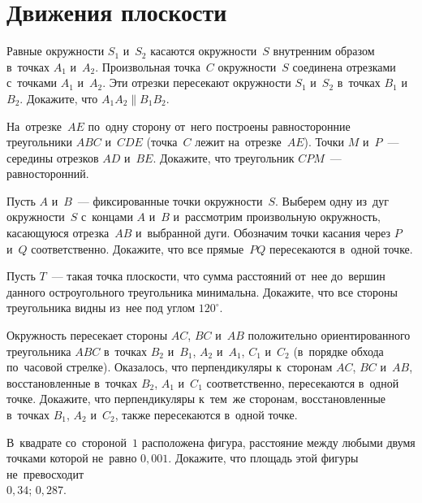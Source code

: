 
\section*{Движения плоскости}


\begin{problems}

\item
Равные окружности $S_1$ и~$S_2$ касаются окружности~$S$ внутренним образом
в~точках $A_1$ и~$A_2$.
Произвольная точка~$C$ окружности~$S$ соединена отрезками с~точками $A_1$ и~$A_2$.
Эти отрезки пересекают окружности $S_1$ и~$S_2$ в~точках $B_1$ и~$B_2$.
Докажите, что $A_1 A_2 \parallel B_1 B_2$.

\item
На~отрезке~$AE$ по~одну сторону от~него построены равносторонние треугольники
$ABC$ и~$CDE$ (точка~$C$ лежит на~отрезке~$AE$).
Точки $M$ и~$P$~--- середины отрезков $AD$ и~$BE$.
Докажите, что треугольник $CPM$~--- равносторонний.

\item{}
Пусть $A$ и~$B$~--- фиксированные точки окружности~$S$.
Выберем одну из~дуг окружности~$S$ с~концами $A$ и~$B$ и~рассмотрим
произвольную окружность, касающуюся отрезка~$AB$ и~выбранной дуги.
Обозначим точки касания через $P$ и~$Q$ соответственно.
Докажите, что все прямые~$PQ$ пересекаются в~одной точке.

\item{}
Пусть $T$~--- такая точка плоскости, что сумма расстояний от~нее до~вершин
данного остроугольного треугольника минимальна.
Докажите, что все стороны треугольника видны из~нее под углом $120^{\circ}$.

\item
Окружность пересекает стороны $AC$, $BC$ и~$AB$ положительно ориентированного
треугольника $ABC$ в~точках $B_2$ и~$B_1$, $A_2$ и~$A_1$, $C_1$ и~$C_2$
(в~порядке обхода по~часовой стрелке).
Оказалось, что перпендикуляры к~сторонам $AC$, $BC$ и~$AB$, восстановленные
в~точках $B_2$, $A_1$ и~$C_1$ соответственно, пересекаются в~одной точке.
Докажите, что перпендикуляры к~тем~же сторонам, восстановленные в~точках
$B_1$, $A_2$ и~$C_2$, также пересекаются в~одной точке.

\item
В~квадрате со~стороной~$1$ расположена фигура, расстояние между любыми двумя
точками которой не~равно $0{,}001$.
Докажите, что площадь этой фигуры не~превосходит
\\
\subproblem $0{,}34$;
\quad
\subproblem $0{,}287$.

\end{problems}


